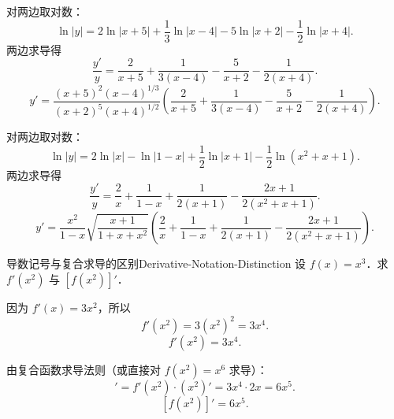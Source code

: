 \begin{solution}

    对两边取对数：
    \begin{equation}
        \ln |y| = 2\ln|x+5| + \frac{1}{3}\ln|x-4| - 5\ln|x+2| - \frac{1}{2}\ln|x+4|.
    \end{equation}
    两边求导得
    \begin{equation}
        \frac{y'}{y} = \frac{2}{x+5} + \frac{1}{3(x-4)} - \frac{5}{x+2} - \frac{1}{2(x+4)}.
    \end{equation}
    \begin{equation}
        \boxed{y' = \frac{(x+5)^2(x-4)^{1/3}}{(x+2)^5(x+4)^{1/2}} \left( \frac{2}{x+5} + \frac{1}{3(x-4)} - \frac{5}{x+2} - \frac{1}{2(x+4)} \right).}
    \end{equation}


    对两边取对数：
    \begin{equation}
        \ln |y| = 2\ln|x| - \ln|1-x| + \frac{1}{2}\ln|x+1| - \frac{1}{2}\ln(x^2+x+1).
    \end{equation}
    两边求导得
    \begin{equation}
        \frac{y'}{y} = \frac{2}{x} + \frac{1}{1-x} + \frac{1}{2(x+1)} - \frac{2x+1}{2(x^2+x+1)}.
    \end{equation}
    \begin{equation}
        \boxed{y' = \frac{x^2}{1-x}\sqrt{\frac{x+1}{1+x+x^2}} \left( \frac{2}{x} + \frac{1}{1-x} + \frac{1}{2(x+1)} - \frac{2x+1}{2(x^2+x+1)} \right).}
    \end{equation}
\end{solution}

\begin{problem}{导数记号与复合求导的区别}{Derivative-Notation-Distinction}
    设 $f(x) = x^3$．求 $f'(x^2)$ 与 $[f(x^2)]'$．
\end{problem}

\begin{solution}
    因为 $f'(x) = 3x^2$，所以
    \begin{equation}
        f'(x^2) = 3(x^2)^2 = 3x^4.
    \end{equation}
    \begin{equation}
        \boxed{f'(x^2) = 3x^4.}
    \end{equation}

    由复合函数求导法则（或直接对 $f(x^2) = x^6$ 求导）：
    \begin{equation}
        [f(x^2)]' = f'(x^2) \cdot (x^2)' = 3x^4 \cdot 2x = 6x^5.
    \end{equation}
    \begin{equation}
        \boxed{[f(x^2)]' = 6x^5.}
    \end{equation}
\end{solution}

